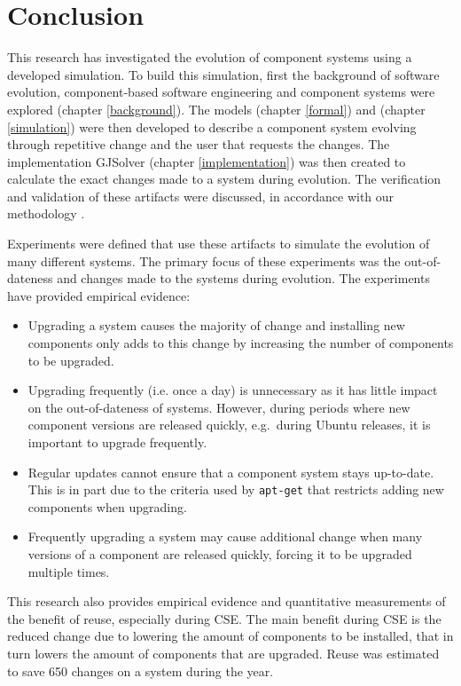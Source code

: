 \chapter{Conclusion}
\label{conclusion}
This research has investigated the evolution of component systems using a developed simulation.
To build this simulation, first the background of software evolution, component-based software engineering and component systems were explored (chapter \ref{background}).
The models \modelname (chapter \ref{formal}) and \usermodel (chapter \ref{simulation}) were then developed 
to describe a component system evolving through repetitive change and the user that requests the changes.
The implementation GJSolver (chapter \ref{implementation}) was then created to calculate the exact changes made to a system during evolution.
The verification and validation of these artifacts were discussed, in accordance with our methodology \citep{Law2005}.

Experiments were defined that use these artifacts to simulate the evolution of many different systems.
The primary focus of these experiments was the out-of-dateness and changes made to the systems during evolution.
The experiments have provided empirical evidence:
\begin{itemize}
  \item Upgrading a system causes the majority of change 
  and installing new components only adds to this change by increasing the number of components to be upgraded.
  \item Upgrading frequently (i.e. once a day) is unnecessary as it has little impact on the out-of-dateness of systems.
  However, during periods where new component versions are released quickly, e.g.\ during Ubuntu releases, 
  it is important to upgrade frequently. 
  \item Regular updates cannot ensure that a component system stays up-to-date.
  This is in part due to the criteria used by \texttt{apt-get} that restricts adding new components when upgrading.
  \item Frequently upgrading a system may cause additional change 
  when many versions of a component are released quickly, forcing it to be upgraded multiple times.
\end{itemize} 

This research also provides empirical evidence and quantitative measurements of the benefit of reuse, especially during CSE.
The main benefit during CSE is the reduced change due to lowering the amount of components to be installed,
that in turn lowers the amount of components that are upgraded.
Reuse was estimated to save 650 changes on a system during the year. 

